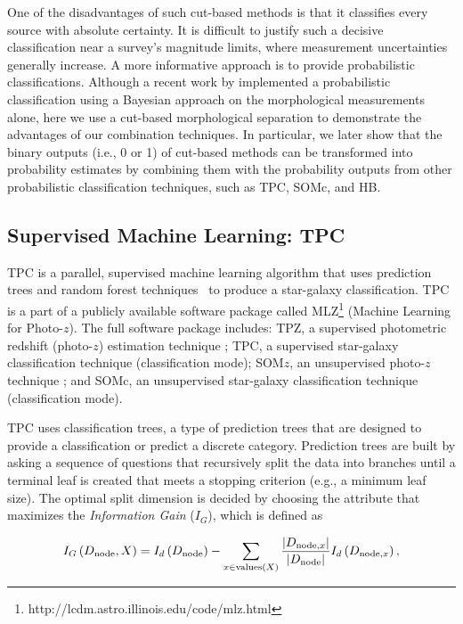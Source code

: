 \documentclass[useAMS,usenatbib]{mn2e}
\newcommand{\eg}{{e.g., }}
\newcommand{\ie}{{i.e., }}
\begin{document}
One of the disadvantages of such cut-based methods is
that it classifies every source with absolute certainty.
It is difficult to justify such a decisive classification
near a survey's magnitude limits,
where measurement uncertainties generally increase.
A more informative approach is to provide probabilistic classifications.
Although a recent work by \citet{henrion2011bayesian}
implemented a probabilistic classification using a Bayesian approach
on the morphological measurements alone,
here we use a cut-based morphological separation
to demonstrate the advantages of our combination techniques.
In particular, we later show that
the binary outputs (\ie 0 or 1) of cut-based methods
can be transformed into
probability estimates by combining them
with the probability outputs from other
probabilistic classification techniques,
such as TPC, SOMc, and HB.


\subsection{Supervised Machine Learning: TPC}

TPC is a parallel, supervised machine learning algorithm
that uses prediction trees and random forest 
techniques~\citep{breiman1984classification, breiman2001random}
to produce a star-galaxy classification.
TPC is a part of a publicly available software package called
\textsc{MLZ}\footnote{http://lcdm.astro.illinois.edu/code/mlz.html}
(Machine Learning for Photo-$z$).
The full software package includes:
\textsc{TPZ}, a supervised photometric redshift (photo-$z$)
estimation technique
\citep[regression mode;][]{carrascokind2013tpz};
TPC, a supervised star-galaxy classification technique
(classification mode);
\textsc{SOM}$z$, an unsupervised photo-$z$ technique
\citep[regression mode;][]{carrascokind2014somz};
and
SOMc, an unsupervised star-galaxy classification technique
(classification mode).

TPC uses classification trees,
a type of prediction trees that are designed to
provide a classification or predict a discrete category.
Prediction trees are built by asking a sequence of questions
that recursively split the data into branches
until a terminal leaf is created
that meets a stopping criterion
(\eg a minimum leaf size).
The optimal split dimension is decided by
choosing the attribute that maximizes
the \textit{Information Gain} ($I_G$), which is defined as

\begin{equation} \label{eq:information_gain}
  I_G \left(D_{{\mathrm{node}}}, X\right)
  = I_d \left( D_{{\mathrm{node}}} \right)
  - \sum_{x \in {\mathrm{values}}(X)}
  \frac{|D_{{\mathrm{node}}, x}|}{|D_{{\mathrm{node}}}|}
  I_d \left( D_{{\mathrm{node}}, x} \right),
\end{equation}
\end{document}
